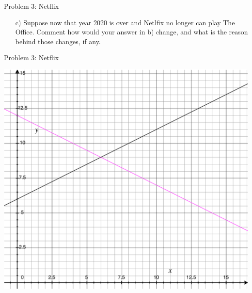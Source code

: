 \documentclass[10pt]{beamer}
\begin{document}
\begin{frame}[t]{Problem 3: Netflix}
    \begin{enumerate}
        \item[c)] Suppose now that year 2020 is over and Netlfix no longer can play The Office.
        Comment how would your answer in b) change, and what is the reason behind those changes, if any.
    \end{enumerate}
\end{frame}

\begin{frame}{Problem 3: Netflix}
    \begin{center}
        \includegraphics[width=.75\textwidth]{prob3_2.pdf}
    \end{center}
\end{frame}


\end{document}
